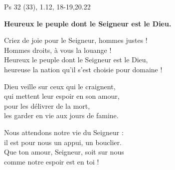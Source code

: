 Ps 32 (33), 1.12, 18-19,20.22

\textbf{Heureux le peuple
dont le Seigneur est le Dieu.}

\smallskip

Criez de joie pour le Seigneur, hommes justes !\\
Hommes droits, à vous la louange !\\
Heureux le peuple dont le Seigneur est le Dieu,\\
heureuse la nation qu’il s’est choisie pour domaine !

\smallskip

Dieu veille sur ceux qui le craignent,\\
qui mettent leur espoir en son amour,\\
pour les délivrer de la mort,\\
les garder en vie aux jours de famine.

\smallskip

Nous attendons notre vie du Seigneur :\\
il est pour nous un appui, un bouclier.\\
Que ton amour, Seigneur, soit sur nous\\
comme notre espoir est en toi !


